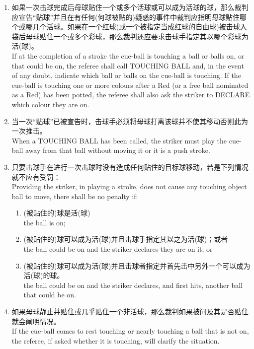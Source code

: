 \begin{enumerate}[label=(\alph*)]
    \item 如果一次击球完成后母球贴住一个或多个活球或可以成为活球的球，那么裁判应宣告``贴球''并且在有任何(何球被贴的)疑惑的事件中裁判应指明母球贴住哪个或哪几个活球。如果在一个红球(或一个被指定当成红球的自由球)被击球入袋后母球贴住一个或多个彩球，那么裁判还应要求击球手指定其以哪个彩球为活(球)。\\
    If at the completion of a stroke the cue-ball is touching a ball or balls on, or that could be on, the referee shall call TOUCHING BALL and, in the event of any doubt, indicate which ball or balls on the cue-ball is touching. If the cue-ball is touching one or more colours after a Red (or a free ball nominated as a Red) has been potted, the referee shall also ask the striker to DECLARE which colour they are on.
    \item 当一次``贴球''已被宣告时，击球手必须将母球打离该球并不使其移动否则此为一次推击。\\
    When a TOUCHING BALL has been called, the striker must play the cue-ball away from that ball without moving it or it is a push stroke.
    \item 只要击球手在进行一次击球时没有造成任何贴住的目标球移动，若是下列情况就不应有受罚：\\
    Providing the striker, in playing a stroke, does not cause any touching object ball to move, there shall be no penalty if:
    \begin{enumerate}[label=(\roman*)]
        \item (被贴住的)球是活(球)\\
        the ball is on;
        \item (被贴住的)球可以成为活(球)并且击球手指定其以之为活(球)；或者\\
        the ball could be on and the striker declares they are on it; or
        \item (被贴住的)球可以成为活(球)并且击球者指定并首先击中另外一个可以成为活(球)的球。\\
        the ball could be on and the striker declares, and first hits, another ball that could be on.
    \end{enumerate}
    \item 如果母球静止并贴住或几乎贴住一个非活球，那么裁判如果被问及其是否贴住就会阐明情况。\\
    If the cue-ball comes to rest touching or nearly touching a ball that is not on, the referee, if asked whether it is touching, will clarify the situation.

\end{enumerate}
